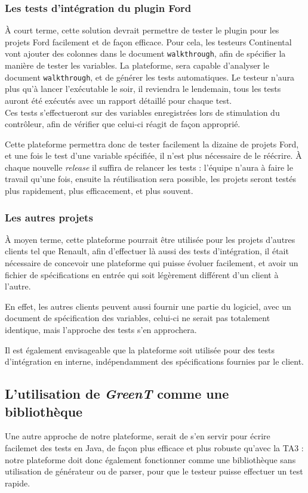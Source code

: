 	\subsubsection{Les tests d'intégration du plugin Ford}
	À court terme, cette solution devrait permettre de tester le plugin pour les projets Ford facilement et de façon efficace. Pour cela, les testeurs Continental vont ajouter des colonnes dans le document \texttt{walkthrough}, afin de spécifier la manière de tester les variables. La plateforme, sera capable d'analyser le document \texttt{walkthrough}, et de générer les tests automatiques. Le testeur n'aura plus qu'à lancer l'exécutable le soir, il reviendra le lendemain, tous les tests auront été exécutés avec un rapport détaillé pour chaque test.\\

	Ces tests s'effectueront sur des variables enregistrées lors de stimulation du contrôleur, afin de vérifier que celui-ci réagit de façon approprié.

	Cette plateforme permettra donc de tester facilement la dizaine de projets Ford, et une fois le test d'une variable spécifiée, il n'est plus nécessaire de le réécrire. À chaque nouvelle \textit{release} il suffira de relancer les tests : l'équipe n'aura à faire le travail qu'une fois, ensuite la réutilisation sera possible, les projets seront testés plus rapidement, plus efficacement, et plus souvent.

	\subsubsection{Les autres projets}
	À moyen terme, cette plateforme pourrait être utilisée pour les projets d'autres clients tel que Renault, afin d'effectuer là aussi des tests d'intégration, il était nécessaire de concevoir une plateforme qui puisse évoluer facilement, et avoir un fichier de spécifications en entrée qui soit légèrement différent d'un client à l'autre.

	En effet, les autres clients peuvent aussi fournir une partie du logiciel, avec un document de spécification des variables, celui-ci ne serait pas totalement identique, mais l'approche des tests s'en approchera.

	Il est également envisageable que la plateforme soit utilisée pour des tests d'intégration en interne, indépendamment des spécifications fournies par le client.

	\subsection{L'utilisation de \textit{GreenT} comme une bibliothèque}
		Une autre approche de notre plateforme, serait de s'en servir pour écrire facilemet des tests en Java, de façon plus efficace et plus robuste qu'avec la TA3 : notre plateforme doit donc également fonctionner comme une bibliothèque sans utilisation de générateur ou de parser, pour que le testeur puisse effectuer un test rapide. 

